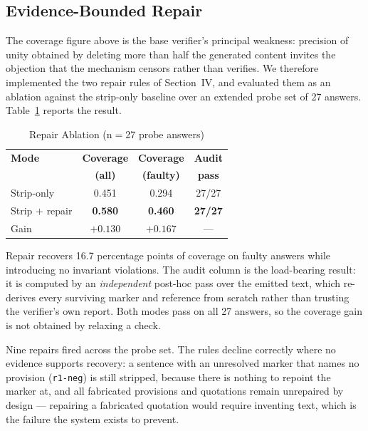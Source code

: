 \documentclass[conference]{IEEEtran}
\begin{document}
\subsection{Evidence-Bounded Repair}

The coverage figure above is the base verifier's principal weakness: precision
of unity obtained by deleting more than half the generated content invites the
objection that the mechanism censors rather than verifies. We therefore
implemented the two repair rules of Section~IV, and evaluated them as an
ablation against the strip-only baseline over an extended probe set of 27
answers. Table~\ref{tab:repair} reports the result.

\begin{table}[t]
\caption{Repair Ablation (n$=$27 probe answers)}
\label{tab:repair}
\centering
\footnotesize
\begin{tabular}{@{}lccc@{}}
\toprule
\textbf{Mode} & \textbf{Coverage} & \textbf{Coverage} & \textbf{Audit} \\
              & \textbf{(all)}    & \textbf{(faulty)} & \textbf{pass} \\
\midrule
Strip-only      & 0.451 & 0.294 & 27/27 \\
Strip $+$ repair & \textbf{0.580} & \textbf{0.460} & \textbf{27/27} \\
\addlinespace
Gain & $+0.130$ & $+0.167$ & --- \\
\bottomrule
\end{tabular}
\end{table}

Repair recovers 16.7 percentage points of coverage on faulty answers while
introducing no invariant violations. The audit column is the load-bearing
result: it is computed by an \emph{independent} post-hoc pass over the emitted
text, which re-derives every surviving marker and reference from scratch rather
than trusting the verifier's own report. Both modes pass on all 27 answers, so
the coverage gain is not obtained by relaxing a check.

Nine repairs fired across the probe set. The rules decline correctly where no
evidence supports recovery: a sentence with an unresolved marker that names no
provision (\texttt{r1-neg}) is still stripped, because there is nothing to
repoint the marker at, and all fabricated provisions and quotations remain
unrepaired by design --- repairing a fabricated quotation would require
inventing text, which is the failure the system exists to prevent.
\end{document}
